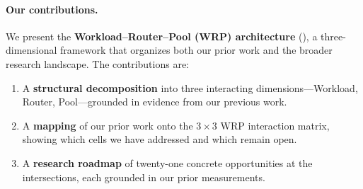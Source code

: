       
\paragraph{Our contributions.}
We present the \textbf{Workload--Router--Pool (WRP) architecture}
(), a three-dimensional framework that organizes both
our prior work and the broader research landscape.  The
contributions are:
\begin{enumerate}[nosep]
  \item A \textbf{structural decomposition} into three interacting
        dimensions---Workload, Router, Pool---grounded in evidence from
        our previous work.
  \item A \textbf{mapping} of our prior work onto the
        $3 \times 3$ WRP interaction matrix, showing which cells we
        have addressed and which remain open.
  \item A \textbf{research roadmap} of twenty-one concrete opportunities at
        the intersections, each grounded in our prior measurements.
\end{enumerate}


